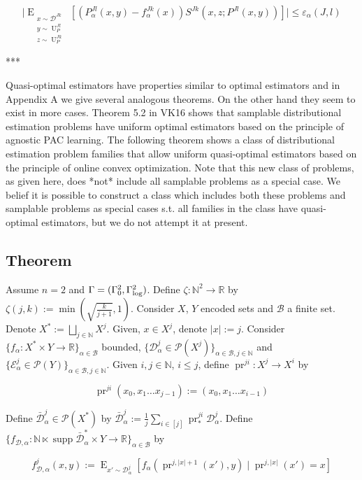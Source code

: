 \documentclass[a4paper]{article}
\DeclareMathOperator{\Supp}{supp}
\DeclareMathOperator{\E}{E}
\newcommand{\EEE}[3]{\operatorname{E}_{\substack{#1 \\ #2 \\ #3}}}
\DeclareMathOperator{\Un}{U}
\DeclareMathOperator{\Prj}{pr}
\newcommand{\Nats}{\mathbb{N}}
\newcommand{\Reals}{\mathbb{R}}
\newcommand{\Abs}[1]{\lvert #1 \rvert}
\newcommand{\Dist}{\mathcal{D}}
\newcommand{\GammaLog}{\Gamma_{\textnormal{log}}}
\newcommand{\Base}{\mathcal{B}}
\newcommand{\Prob}{\mathcal{P}}
\begin{document}
$$\Abs{\EEE{x \sim \Dist^{Jk}}{y \sim \Un_P^{Jl}}{z \sim \Un_P^{Jk}}[(P_\alpha^{Jl}(x,y)-f_\alpha^{Jk}(x))S^{Jk}(x,z;P^{Jl}(x,y))]} \leq \varepsilon_\alpha(J,l)$$

***

Quasi-optimal estimators have properties similar to optimal estimators and in Appendix A we give several analogous theorems. On the other hand they seem to exist in more cases. Theorem 5.2 in VK16 shows that samplable distributional estimation problems have uniform optimal estimators based on the principle of agnostic PAC learning. The following theorem shows a class of distributional estimation problem families that allow uniform quasi-optimal estimators based on the principle of online convex optimization. Note that this new class of problems, as given here, does *not* include all samplable problems as a special case. We belief it is possible to construct a class which includes both these problems and samplable problems as special cases s.t. all families in the class have quasi-optimal estimators, but we do not attempt it at present.

\subsection{Theorem}

Assume ${n=2}$ and ${\Gamma= (\Gamma_0^2, \GammaLog^2)}$. Define ${\zeta: \Nats^2 \rightarrow \Reals}$ by ${\zeta(j,k):=\min(\sqrt{\frac{k}{j+1}},1)}$. Consider ${X}$, ${Y}$ encoded sets and ${\Base}$ a finite set. Denote ${X^*:=\bigsqcup_{j \in \Nats} X^j}$. Given, ${x \in X^j}$, denote ${\Abs{x}:=j}$. Consider ${\{f_\alpha: X^* \times Y \rightarrow \Reals\}_{\alpha \in \Base}}$ bounded, ${\{\Dist_\alpha^j \in \Prob(X^j)\}_{\alpha \in \Base, j \in \Nats}}$ and ${\{\mathcal{E}_\alpha^j \in \Prob(Y)\}_{\alpha \in \Base, j \in \Nats}}$. Given ${i,j \in \Nats}$, ${i \leq j}$, define ${\Prj^{ji}: X^j \rightarrow X^i}$ by

$${\Prj^{ji}(x_0, x_1 \ldots x_{j-1}):=(x_0, x_1 \ldots x_{i-1})}$$

Define ${\bar{\Dist}_\alpha^j \in \Prob(X^*)}$ by ${\bar{\Dist}_\alpha^j:=\frac{1}{j}\sum_{i \in [j]} \Prj^{ji}_* \Dist_\alpha^j}$. Define ${\{f_{\Dist,\alpha}: \Nats \ltimes \Supp \bar{\Dist}_\alpha^* \times Y \rightarrow \Reals\}_{\alpha \in \Base}}$ by 

$${f_{\Dist,\alpha}^j(x,y):=\E_{x' \sim \Dist_\alpha^j}[f_\alpha(\Prj^{j,\Abs{x}+1}(x'),y) \mid \Prj^{j,\Abs{x}}(x')=x]}$$
\end{document}
